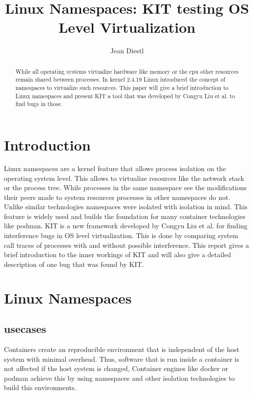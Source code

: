 \documentclass[10pt,twocolumn,a4paper]{article}
\author{Jean Diestl}
\begin{document}
\title{Linux Namespaces: KIT testing OS Level Virtualization}

\newcommand{\todo}[1]{{\texttt{[#1]}}}
\newcommand{\code}[1]{{\tt \small{#1}}}

\maketitle
\lstset{language=C, basicstyle=\ttfamily,
        columns=fullflexible,
        string=[b]', showspaces=false, showtabs=false,
         captionpos=b,
        framerule=1pt,
        breaklines=true, breakatwhitespace=true,
        autogobble=true}


\begin{abstract}
While all operating systems virtualize hardware like memory or the cpu other resources remain shared between processes.
In kernel 2.4.19 Linux introduced the concept of namespaces to virtualize such resources. This paper will give a brief 
introduction to Linux namespaces and present KIT a tool that was developed by Congyu Liu et al. to
find bugs in those.
\end{abstract}

\section{Introduction}\label{sec:introduction}
Linux namespaces are a kernel feature that allows process isolation on the operating system level.
This allows to virtualize resources like the network stack or the process tree.
While processes in the same namespace see the modifications their peers made to system resources
processes in other namespaces do not. Unlike similar technologies namespaces were isolated with
isolation in mind. 
This feature is widely used and builds the foundation for many container technologies like podman.
KIT is a new framework developed by Congyu Liu et al. for finding interference bugs in OS level virtualization\cite{0}. 
This is done by comparing system call traces of processes with and without possible interference.
This report gives a brief introduction to the inner
workings of KIT and will also give a detailed description of one bug
that was found by KIT. 

\section{Linux Namespaces}\label{sec:background}

\subsection{usecases}
Containers create an reproducible environment that is independent of the host system with minimal overhead.
Thus, software that is run inside a container is not affected if the host system is changed, 
Container engines like docker or podman achieve this by using namespaces and other isolation technologies to build this environments.
\end{document}
